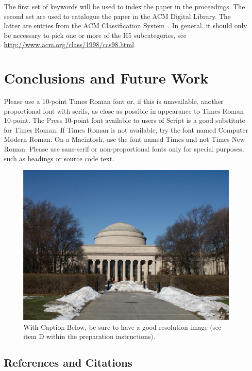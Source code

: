\documentclass{sigchi}
\begin{document}
The first set of keywords will be used to index the paper in the
proceedings. The second set are used to catalogue the paper in the ACM
Digital Library. The latter are entries from the ACM Classification
System~\cite{acm_categories}.  In general, it should only be necessary
to pick one or more of the H5 subcategories, see
\url{http://www.acm.org/class/1998/ccs98.html}

\section{Conclusions and Future Work}

Please use a 10-point Times Roman font or, if this is unavailable,
another proportional font with serifs, as close as possible in
appearance to Times Roman 10-point. The Press 10-point font available
to users of Script is a good substitute for Times Roman. If Times
Roman is not available, try the font named Computer Modern Roman. On a
Macintosh, use the font named Times and not Times New Roman. Please
use sans-serif or non-proportional fonts only for special purposes,
such as headings or source code text.

\begin{figure}[!h]
\centering
\includegraphics[width=0.9\columnwidth]{Figure1}
\caption{With Caption Below, be sure to have a good resolution image
  (see item D within the preparation instructions).}
\label{fig:figure1}
\end{figure}

\subsection{References and Citations}
\end{document}
